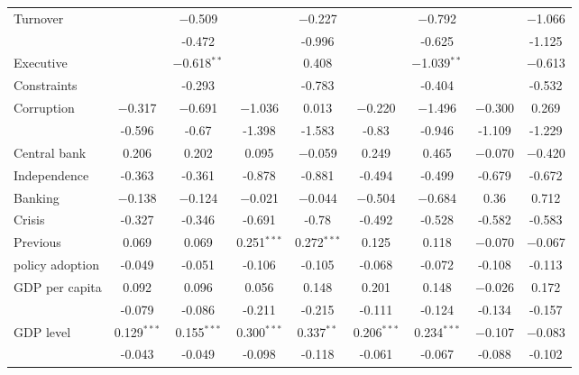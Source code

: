 \begin{landscape}
\begin{table}[!htbp]
\begin{tabular}{@{\extracolsep{5pt}}lcccccccc}
Turnover	&		&	$-$0.509	&		&	$-$0.227	&		&	$-$0.792	&		&	$-$1.066	\\																	
	&		&	-0.472	&		&	-0.996	&		&	-0.625	&		&	-1.125	\\																	
																																		
Executive 	&		&	$-$0.618$^{**}$	&		&	0.408	&		&	$-$1.039$^{**}$	&		&	$-$0.613	\\																	
Constraints	&		&	-0.293	&		&	-0.783	&		&	-0.404	&		&	-0.532	\\																	
																																		
Corruption	&	$-$0.317	&	$-$0.691	&	$-$1.036	&	0.013	&	$-$0.220	&	$-$1.496	&	$-$0.300	&	0.269	\\																	
	&	-0.596	&	-0.67	&	-1.398	&	-1.583	&	-0.83	&	-0.946	&	-1.109	&	-1.229	\\																	
																																		
Central bank	&	0.206	&	0.202	&	0.095	&	$-$0.059	&	0.249	&	0.465	&	$-$0.070	&	$-$0.420	\\																	
Independence	&	-0.363	&	-0.361	&	-0.878	&	-0.881	&	-0.494	&	-0.499	&	-0.679	&	-0.672	\\																	
																																		
Banking	&	$-$0.138	&	$-$0.124	&	$-$0.021	&	$-$0.044	&	$-$0.504	&	$-$0.684	&	0.36	&	0.712	\\																	
Crisis	&	-0.327	&	-0.346	&	-0.691	&	-0.78	&	-0.492	&	-0.528	&	-0.582	&	-0.583	\\																	
																																		
Previous 	&	0.069	&	0.069	&	0.251$^{***}$	&	0.272$^{***}$	&	0.125	&	0.118	&	$-$0.070	&	$-$0.067	\\																	
policy adoption	&	-0.049	&	-0.051	&	-0.106	&	-0.105	&	-0.068	&	-0.072	&	-0.108	&	-0.113	\\																	
																																		
GDP per capita	&	0.092	&	0.096	&	0.056	&	0.148	&	0.201	&	0.148	&	$-$0.026	&	0.172	\\																	
	&	-0.079	&	-0.086	&	-0.211	&	-0.215	&	-0.111	&	-0.124	&	-0.134	&	-0.157	\\																	
																																		
GDP level	&	0.129$^{***}$	&	0.155$^{***}$	&	0.300$^{***}$	&	0.337$^{**}$	&	0.206$^{***}$	&	0.234$^{***}$	&	$-$0.107	&	$-$0.083	\\																	
	&	-0.043	&	-0.049	&	-0.098	&	-0.118	&	-0.061	&	-0.067	&	-0.088	&	-0.102	\\																	
																																		

\end{tabular}
\end{table}
\end{landscape}
